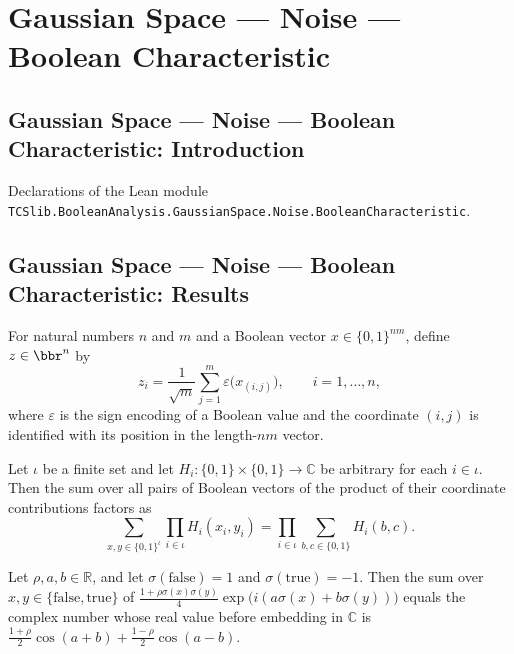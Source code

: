 \section{Gaussian Space --- Noise --- Boolean Characteristic}
\subsection*{Gaussian Space --- Noise --- Boolean Characteristic: Introduction}

Declarations of the Lean module \texttt{TCSlib.BooleanAnalysis.GaussianSpace.Noise.BooleanCharacteristic}.

\subsection*{Gaussian Space --- Noise --- Boolean Characteristic: Results}

\begin{definition}
\label{BooleanAnalysis.GaussianSpace.normalizedCubeBlocks}
\leanok
{}
For natural numbers $n$ and $m$ and a Boolean vector $x\in\{0,1\}^{nm}$, define
$z\in\bbr^n$ by
\[
z_i=\frac{1}{\sqrt m}\sum_{j=1}^m \varepsilon\bigl(x_{(i,j)}\bigr),\qquad i=1,\ldots,n,
\]
where $\varepsilon$ is the sign encoding of a Boolean value and the coordinate $(i,j)$
is identified with its position in the length-$nm$ vector.
\end{definition}

\begin{lemma}
\label{BooleanAnalysis.GaussianSpace.sum_pair_coordinate_products}
\leanok
{}
Let $\iota$ be a finite set and let $H_i:\{0,1\}\times\{0,1\}\to\mathbb C$ be arbitrary
for each $i\in\iota$. Then the sum over all pairs of Boolean vectors of the product of
their coordinate contributions factors as
\[\sum_{x,y\in\{0,1\}^{\iota}}\prod_{i\in\iota}H_i(x_i,y_i)=\prod_{i\in\iota}\sum_{b,c\in\{0,1\}}H_i(b,c).\]
\end{lemma}

\begin{lemma}
\label{BooleanAnalysis.GaussianSpace.sum_correlatedSign_phase}
\leanok
{}
Let $\rho,a,b\in\mathbb R$, and let $\sigma(\mathrm{false})=1$ and
$\sigma(\mathrm{true})=-1$. Then the sum over $x,y\in\{\mathrm{false},\mathrm{true}\}$
of $\frac{1+\rho\sigma(x)\sigma(y)}{4}\exp\!\bigl(i(a\sigma(x)+b\sigma(y))\bigr)$ equals
the complex number whose real value before embedding in $\mathbb C$ is
$\frac{1+\rho}{2}\cos(a+b)+\frac{1-\rho}{2}\cos(a-b)$.
\end{lemma}

